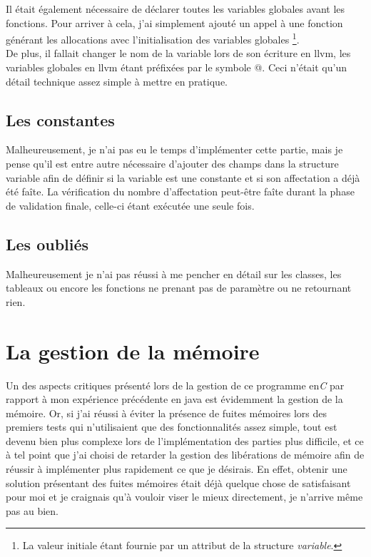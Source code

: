 \documentclass[12pt]{article}
\begin{document}
Il était également nécessaire de déclarer toutes les variables globales avant
les fonctions. Pour arriver à cela, j'ai simplement ajouté un appel à une
fonction générant les allocations avec l'initialisation des variables globales
\footnote{La valeur initiale étant fournie par un attribut de la structure
{\em variable}.}.\\

De plus, il fallait changer le nom de la variable lors de son écriture en llvm,
les variables globales en llvm étant préfixées par le symbole @. Ceci n'était
qu'un détail technique assez simple à mettre en pratique.

\subsection{Les constantes}
Malheureusement, je n'ai pas eu le temps d'implémenter cette partie, mais je
pense qu'il est entre autre nécessaire d'ajouter des champs dans la structure
variable afin de définir si la variable est une constante et si son affectation 
a déjà été faîte. La vérification du nombre d'affectation peut-être faîte durant
la phase de validation finale, celle-ci étant exécutée une seule fois.

\subsection{Les oubliés}
Malheureusement je n'ai pas réussi à me pencher en détail sur les classes, les
tableaux ou encore les fonctions ne prenant pas de paramètre ou ne retournant
rien. 

\section{La gestion de la mémoire}
Un des aspects critiques présenté lors de la gestion de ce programme en{\em C}
par rapport à mon expérience précédente en java est évidemment la gestion de
la mémoire. Or, si j'ai réussi à éviter la présence de fuites mémoires lors
des premiers tests qui n'utilisaient que des fonctionnalités assez simple,
tout est devenu bien plus complexe lors de l'implémentation des parties plus
difficile, et ce à tel point que j'ai choisi de retarder la gestion des
libérations de mémoire afin de réussir à implémenter plus rapidement ce que je
désirais. En effet, obtenir une solution présentant des fuites mémoires était
déjà quelque chose de satisfaisant pour moi et je craignais qu'à vouloir
viser le mieux directement, je n'arrive même pas au bien.
\end{document}
